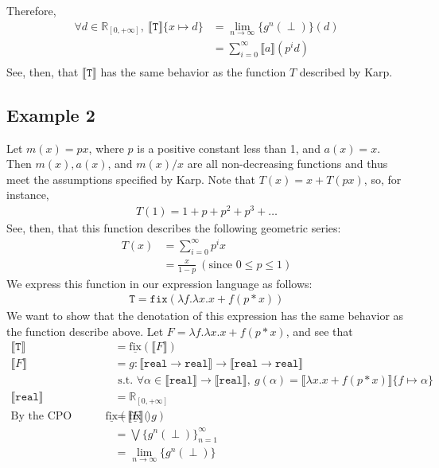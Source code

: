 \documentclass{westhesis}
\theoremstyle{plain}
\theoremstyle{definition}
\newcommand{\R}{\mathbb{R}}
\begin{document}
Therefore, 
\begin{align*}
\forall d \in \R_{[0,+\infty]}, \ \llbracket \texttt{T} \rrbracket\{x \mapsto d\} &= \lim_{n \to \infty}\{g^n (\perp)\}(d) \\
&= \sum_{i=0}^{\infty} \llbracket a \rrbracket (p^{i}d) \\
 \end{align*}
 See, then, that $\llbracket \texttt{T} \rrbracket$ has the same behavior as the function $T$ described by Karp.

\subsection{Example 2}
Let $m(x) = px$, where $p$ is a positive constant less than 1, and $a(x) = x$. Then $m(x), a(x)$, and $m(x)/x$ are all non-decreasing functions and thus meet the assumptions specified by Karp. Note that $T(x) = x + T(px)$, so, for instance,
\begin{align*}
T(1) = 1 + p + p^2 + p^3 + \ldots
\end{align*}
See, then, that this function describes the following geometric series:
\begin{align*}
T(x) &= \sum_{i=0}^{\infty} p^ix \\ 
&= \frac{x}{1 - p} \ (\text{since } 0 \leq p \leq 1)
\end{align*}
We express this function in our expression language as follows:
\begin{align*}
 \texttt{T} = \texttt{fix}(\lambda f. \lambda x.x + f (p * x))
 \end{align*}
We want to show that the denotation of this expression has the same behavior as the function describe above. Let $F = \lambda f. \lambda x.x + f (p * x)$, and see that 
 \begin{align*}
 \llbracket \texttt{T} \rrbracket &= \underline{\text{fix}}(\llbracket F \rrbracket) \\
 \llbracket F \rrbracket &= g : \llbracket \texttt{real} \rightarrow \texttt{real}\rrbracket \rightarrow \llbracket \texttt{real} \rightarrow \texttt{real}\rrbracket \\ &\text{ \ \ \ s.t. } \forall \alpha \in \llbracket \texttt{real}\rrbracket \rightarrow \llbracket \texttt{real}\rrbracket, \ 
 g(\alpha) = \llbracket \lambda x.x + f (p * x)\rrbracket\{f \mapsto \alpha\} \\
 \llbracket \texttt{real}\rrbracket &= \R_{[0, +\infty]}  
 \\\text{By the CPO fixpoint theorem, } \underline{\text{fix}}(\llbracket F \rrbracket) &= \underline{\text{fix}}(g) \\
&= \bigvee\{g^n (\perp)\}^{\infty}_{n=1} \\
&= \lim_{n \to \infty}\{g^n (\perp)\}
 \end{align*}
\end{document}
